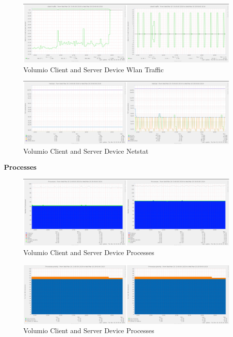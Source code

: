 \documentclass[11pt,a4paper,headinclude=false,footinclude=false]{scrreprt}
\begin{document}
\begin{figure}[H]
\includegraphics{ResultsAndAnalysis/VolumioServerTestImages/023VolumioWlan0Traffic.png}
\centering
\caption{Volumio Client and Server Device Wlan Traffic}
\label{VolumioWlanTraffic}
\end{figure}

\begin{figure}[H]
\includegraphics{ResultsAndAnalysis/VolumioServerTestImages/018VolumioNetstat.png}
\centering
\caption{Volumio Client and Server Device Netstat}
\label{VolumioNetstat}
\end{figure}

\textbf{Processes}

\begin{figure}[H]
\includegraphics{ResultsAndAnalysis/VolumioServerTestImages/020VolumioProcesses.png}
\centering
\caption{Volumio Client and Server Device Processes}
\label{VolumioProcesses}
\end{figure}

\begin{figure}[H]
\includegraphics{ResultsAndAnalysis/VolumioServerTestImages/021VolumioProcessPriority.png}
\centering
\caption{Volumio Client and Server Device Processes}
\label{VolumioProcessPriority}
\end{figure}
\end{document}
